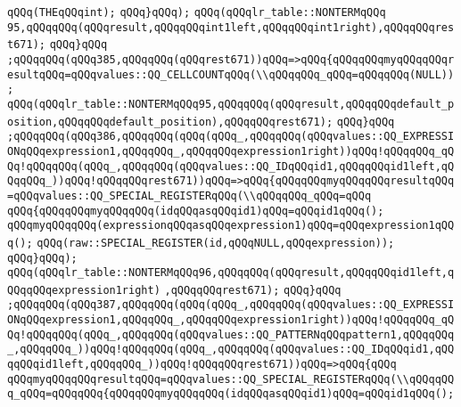 \verb|qQQq(THEqQQqint);|\newline
\verb|qQQq}qQQq);|\newline
\verb|qQQq(qQQqlr_table::NONTERMqQQq|\newline
\verb|95,qQQqqQQq(qQQqresult,qQQqqQQqint1left,qQQqqQQqint1right),qQQqqQQqrest671);|\newline
\verb|qQQq}qQQq|\newline
\verb|;qQQqqQQq(qQQq385,qQQqqQQq(qQQqrest671))qQQq=>qQQq{qQQqqQQqmyqQQqqQQqresultqQQq=qQQqvalues::QQ_CELLCOUNTqQQq(\\qQQqqQQq_qQQq=qQQqqQQq(NULL));|\newline
\verb|qQQq(qQQqlr_table::NONTERMqQQq95,qQQqqQQq(qQQqresult,qQQqqQQqdefault_position,qQQqqQQqdefault_position),qQQqqQQqrest671);|\newline
\verb|qQQq}qQQq|\newline
\verb|;qQQqqQQq(qQQq386,qQQqqQQq(qQQq(qQQq_,qQQqqQQq(qQQqvalues::QQ_EXPRESSIONqQQqexpression1,qQQqqQQq_,qQQqqQQqexpression1right))qQQq!qQQqqQQq_qQQq!qQQqqQQq(qQQq_,qQQqqQQq(qQQqvalues::QQ_IDqQQqid1,qQQqqQQqid1left,qQQqqQQq_))qQQq!qQQqqQQqrest671))qQQq=>qQQq{qQQqqQQqmyqQQqqQQqresultqQQq=qQQqvalues::QQ_SPECIAL_REGISTERqQQq(\\qQQqqQQq_qQQq=qQQq|\newline
\verb|qQQq{qQQqqQQqmyqQQqqQQq(idqQQqasqQQqid1)qQQq=qQQqid1qQQq();|\newline
\verb|qQQqmyqQQqqQQq(expressionqQQqasqQQqexpression1)qQQq=qQQqexpression1qQQq();|\newline
\verb|qQQq(raw::SPECIAL_REGISTER(id,qQQqNULL,qQQqexpression));|\newline
\verb|qQQq}qQQq);|\newline
\verb|qQQq(qQQqlr_table::NONTERMqQQq96,qQQqqQQq(qQQqresult,qQQqqQQqid1left,qQQqqQQqexpression1right)|\newline
\verb|,qQQqqQQqrest671);|\newline
\verb|qQQq}qQQq|\newline
\verb|;qQQqqQQq(qQQq387,qQQqqQQq(qQQq(qQQq_,qQQqqQQq(qQQqvalues::QQ_EXPRESSIONqQQqexpression1,qQQqqQQq_,qQQqqQQqexpression1right))qQQq!qQQqqQQq_qQQq!qQQqqQQq(qQQq_,qQQqqQQq(qQQqvalues::QQ_PATTERNqQQqpattern1,qQQqqQQq_,qQQqqQQq_))qQQq!qQQqqQQq(qQQq_,qQQqqQQq(qQQqvalues::QQ_IDqQQqid1,qQQqqQQqid1left,qQQqqQQq_))qQQq!qQQqqQQqrest671))qQQq=>qQQq{qQQq|\newline
\verb|qQQqmyqQQqqQQqresultqQQq=qQQqvalues::QQ_SPECIAL_REGISTERqQQq(\\qQQqqQQq_qQQq=qQQqqQQq{qQQqqQQqmyqQQqqQQq(idqQQqasqQQqid1)qQQq=qQQqid1qQQq();|\newline
